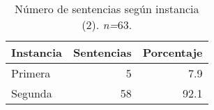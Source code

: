 \begin{table}[!htbp]
\centering
\caption{Número de sentencias según instancia (2). \textit{n=}63.} 
\label{tab:instancia}
\begin{tabular}{lrr}
  \hline
Instancia & Sentencias & Porcentaje \\ 
  \hline
Primera &  5 & 7.9 \\ 
  Segunda & 58 & 92.1 \\ 
   \hline
\end{tabular}
\end{table}
